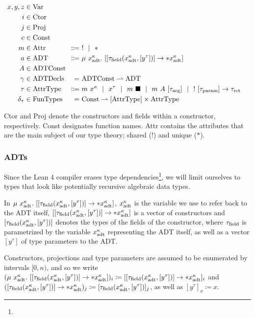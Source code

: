 \begin{alignat*}{2}
  x, y, z &\in \Var \\
  i &\in \Ctor \\
  j &\in \Proj \\
  c &\in \Const \\
  m &\in \Attr &\Coloneqq&\ ! \sep * \\
  a &\in \ADT &\Coloneqq&\ \mu\ x^\kappa_\adt.\ [[\tau_\field(x^\kappa_\adt, [y^\tau])] \to *x^\kappa_\adt] \\
  A &\in \mathrlap{\ADTConst} \\
  \gamma &\in \ADTDecls &=&\ \ADTConst \rightharpoonup \ADT \\
  \tau &\in \AttrType &\Coloneqq&\ m\ x^\kappa \sep x^\tau \sep m\ \blacksquare \sep m\ A\ [\tau_\arrg] \sep !\ [\tau_\param] \to \tau_\ret \\
  \delta_\tau &\in \FunTypes &=&\ \Const \rightharpoonup [\AttrType] \times \AttrType
\end{alignat*}

Ctor and Proj denote the constructors and fields within a constructor, respectively. Const designates function names. Attr contains the attributes that are the main subject of our type theory; shared (!) and unique ($*$). 

\subsubsection{ADTs}
Since the Lean 4 compiler erases type dependencies\footnote{}, we will limit ourselves to types that look like potentially recursive algebraic data types. 

\sloppy In $\mu\ x^\kappa_\adt.\ [[\tau_\field(x^\kappa_\adt, [y^\tau])] \to *x^\kappa_\adt]$, $x^\kappa_{\mathrm{adt}}$ is the variable we use to refer back to the ADT itself, $[[\tau_{\mathrm{field}}(x^\kappa_{\mathrm{adt}}, [y^\tau])] \to *x^\kappa_{\mathrm{adt}}]$ is a vector of constructors and $[\tau_{\mathrm{field}}(x^\kappa_{\mathrm{adt}}, [y^\tau])]$ denotes the types of the fields of the constructor, where $\tau_{\mathrm{field}}$ is parametrized by the variable $x^\kappa_{\mathrm{adt}}$ representing the ADT itself, as well as a vector $[y^\tau]$ of type parameters to the ADT. 

Constructors, projections and type parameters are assumed to be enumerated by intervals $[0, n)$, and so we write $(\mu\ x^\kappa_\adt.\ [[\tau_\field(x^\kappa_\adt, [y^\tau])] \to *x^\kappa_\adt])_i \coloneqq [[\tau_\field(x^\kappa_\adt, [y^\tau])] \to *x^\kappa_\adt]_i$ and $([\tau_{\mathrm{field}}(x^\kappa_{\mathrm{adt}}, [y^\tau])] \to *x^\kappa_{\mathrm{adt}})_j \coloneqq [\tau_{\mathrm{field}}(x^\kappa_{\mathrm{adt}}, [y^\tau])]_j$, as well as $[y^\tau]_x \coloneqq x$. 


